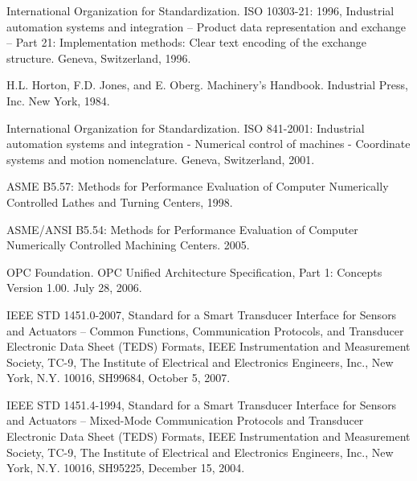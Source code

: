 International Organization for Standardization. ISO 10303-21: 1996, Industrial automation systems and integration -- Product data representation and exchange -- Part 21: Implementation methods: Clear text encoding of the exchange structure. Geneva, Switzerland, 1996.

H.L. Horton, F.D. Jones, and E. Oberg. Machinery's Handbook. Industrial Press, Inc. New York, 1984.

International Organization for Standardization. ISO 841-2001: Industrial automation systems and integration - Numerical control of machines - Coordinate systems and motion nomenclature. Geneva, Switzerland, 2001.

ASME B5.57: Methods for Performance Evaluation of Computer Numerically Controlled Lathes and Turning Centers, 1998.

ASME/ANSI B5.54: Methods for Performance Evaluation of Computer Numerically Controlled Machining Centers. 2005.

OPC Foundation. OPC Unified Architecture Specification, Part 1: Concepts Version 1.00. July 28, 2006.

IEEE STD 1451.0-2007, Standard for a Smart Transducer Interface for Sensors and Actuators – Common Functions, Communication Protocols, and Transducer Electronic Data Sheet (TEDS) Formats, IEEE Instrumentation and Measurement Society, TC-9, The Institute of Electrical and Electronics Engineers, Inc., New York, N.Y. 10016, SH99684, October 5, 2007.

IEEE STD 1451.4-1994, Standard for a Smart Transducer Interface for Sensors and Actuators – Mixed-Mode Communication Protocols and Transducer Electronic Data Sheet (TEDS) Formats, IEEE Instrumentation and Measurement Society, TC-9, The Institute of Electrical and Electronics Engineers, Inc., New York, N.Y. 10016, SH95225, December 15, 2004. 